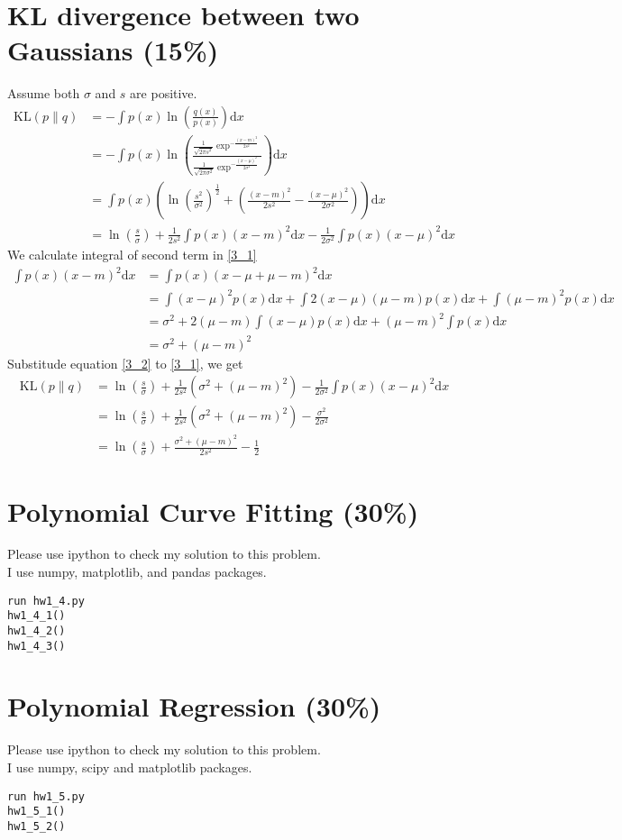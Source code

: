 \documentclass[12pt]{article}
\numberwithin{equation}{section}
\begin{document}
\section{KL divergence between two Gaussians (15\%)}
Assume both $\sigma$ and $s$ are positive.
\begin{align}
  \mathrm{KL}(p\parallel q)
    & = -\int p(x)\ln\left(\frac{q(x)}{p(x)}\right)\mathrm{d}x\nonumber\\
    & = -\int p(x)\ln\left(\frac{\frac{1}{\sqrt{2\pi s^2}}\exp^{-\frac{(x-m)^2}{2s^2}}}{\frac{1}{\sqrt{2\pi\sigma^2}}\exp^{-\frac{(x-\mu)^2}{2\sigma^2}}}\right)\mathrm{d}x\nonumber\\
    & = \int p(x)\left(\ln\left(\frac{s^2}{\sigma^2}\right)^\frac{1}{2}+\left(\frac{(x-m)^2}{2s^2}-\frac{(x-\mu)^2}{2\sigma^2}\right)\right)\mathrm{d}x\nonumber\\
    & = \ln(\frac{s}{\sigma})+\frac{1}{2s^2}\int p(x)(x-m)^2\mathrm{d}x-\frac{1}{2\sigma^2}\int p(x)(x-\mu)^2\mathrm{d}x\label{3_1}
\end{align}
We calculate integral of second term in \eqref{3_1}
\begin{align}
  \int p(x)(x-m)^2\mathrm{d}x
    & = \int p(x)(x-\mu+\mu-m)^2\mathrm{d}x\nonumber\\
    & = \int (x-\mu)^2p(x)\mathrm{d}x+\int 2(x-\mu)(\mu-m)p(x)\mathrm{d}x+\int (\mu-m)^2p(x)\mathrm{d}x\nonumber\\
    & = \sigma^2+2(\mu-m)\int (x-\mu)p(x)\mathrm{d}x+(\mu-m)^2\int p(x)\mathrm{d}x\nonumber\\
    & = \sigma^2+(\mu-m)^2\label{3_2}
\end{align}
Substitude equation \eqref{3_2} to \eqref{3_1}, we get
\begin{align*}
  \mathrm{KL}(p\parallel q)
    & = \ln(\frac{s}{\sigma})+\frac{1}{2s^2}\left(\sigma^2+(\mu-m)^2\right)-\frac{1}{2\sigma^2}\int p(x)(x-\mu)^2\mathrm{d}x\\
    & = \ln(\frac{s}{\sigma})+\frac{1}{2s^2}\left(\sigma^2+(\mu-m)^2\right)-\frac{\sigma^2}{2\sigma^2}\\
    & = \ln(\frac{s}{\sigma})+\frac{\sigma^2+(\mu-m)^2}{2s^2}-\frac{1}{2}
\end{align*}
\section{Polynomial Curve Fitting (30\%)}
Please use ipython to check my solution to this problem.\\
I use numpy, matplotlib, and pandas packages.
\begin{lstlisting}
run hw1_4.py
hw1_4_1()
hw1_4_2()
hw1_4_3()
\end{lstlisting}
\section{Polynomial Regression (30\%)}
Please use ipython to check my solution to this problem.\\
I use numpy, scipy and matplotlib packages.
\begin{lstlisting}
run hw1_5.py
hw1_5_1()
hw1_5_2()
\end{lstlisting}
\end{document}
